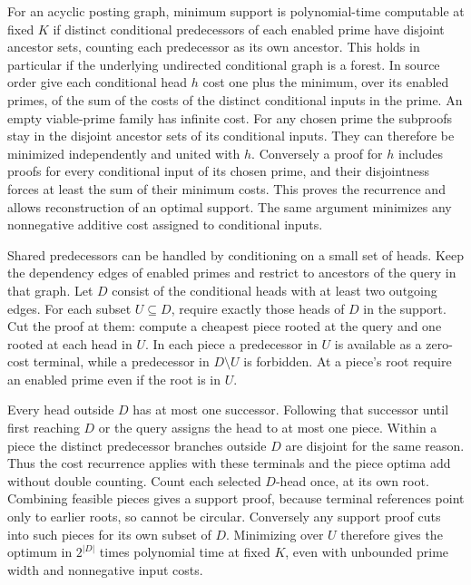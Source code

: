 For an acyclic posting graph, minimum support is
polynomial-time computable at fixed $K$ if distinct conditional predecessors of
each enabled prime have disjoint ancestor sets,
counting each predecessor as its own ancestor.
This holds in particular if the underlying
undirected conditional graph is a forest. In
source order give each conditional head $h$ cost
one plus the minimum, over its enabled primes, of
the sum of the costs of the distinct conditional
inputs in the prime. An empty viable-prime family
has infinite cost. For any chosen prime the
subproofs stay in the disjoint ancestor sets of
its conditional inputs. They can therefore be
minimized independently and united with $h$.
Conversely a proof for $h$ includes proofs for
every conditional input of its chosen prime,
and their disjointness forces at least the sum
of their minimum costs. This proves the recurrence
and allows reconstruction of an optimal support.
The same argument minimizes any nonnegative
additive cost assigned to conditional inputs.

Shared predecessors can be handled by conditioning
on a small set of heads. Keep the dependency edges
of enabled primes and restrict to ancestors of the
query in that graph. Let $D$ consist of the
conditional heads with at least two outgoing edges.
For each subset $U\subseteq D$, require exactly
those heads of $D$ in the support. Cut the proof
at them: compute a cheapest piece rooted at the
query and one rooted at each head in $U$. In each
piece a predecessor in $U$ is available as a
zero-cost terminal, while a predecessor in
$D\setminus U$ is forbidden. At a piece's root
require an enabled prime even if the root is in $U$.

Every head outside $D$ has at most one successor.
Following that successor until first reaching
$D$ or the query assigns the head to at most one
piece. Within a piece the distinct predecessor
branches outside $D$ are disjoint for the same
reason. Thus the cost recurrence applies with
these terminals and the piece optima add without
double counting. Count each selected $D$-head
once, at its own root. Combining feasible pieces
gives a support proof, because terminal references
point only to earlier roots, so cannot be circular.
Conversely any support proof cuts into such pieces
for its own subset of $D$. Minimizing over $U$
therefore gives the optimum in $2^{|D|}$ times
polynomial time at fixed $K$, even with unbounded
prime width and nonnegative input costs.

